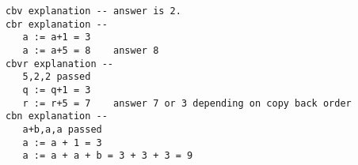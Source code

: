 \begin{questions}
\begin{subquestions}
\begin{modelanswer}
\begin{verbatim}
cbv explanation -- answer is 2.
cbr explanation -- 
   a := a+1 = 3
   a := a+5 = 8    answer 8
cbvr explanation --
   5,2,2 passed
   q := q+1 = 3
   r := r+5 = 7    answer 7 or 3 depending on copy back order
cbn explanation --
   a+b,a,a passed
   a := a + 1 = 3
   a := a + a + b = 3 + 3 + 3 = 9 
\end{verbatim}
\end{modelanswer}

\end{subquestions}
\end{questions}




